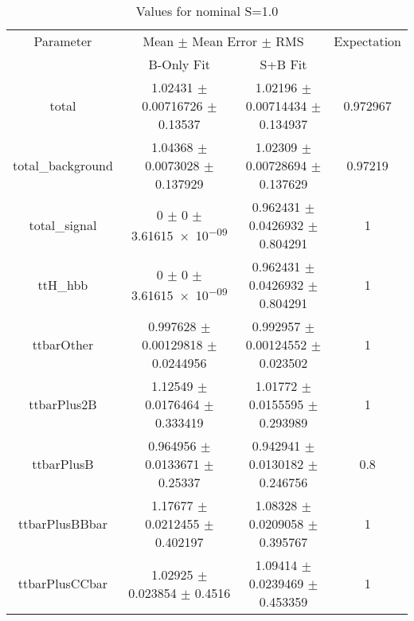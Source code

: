 \begin{table}
\centering
\caption{Values for nominal S=1.0}
\begin{tabular}{cccc}
\toprule
Parameter & \multicolumn{2}{c}{Mean $\pm$ Mean Error $\pm$ RMS} & Expectation\\
 & B-Only Fit & S+B Fit & \\
\midrule
total & \num{1.02431} $\pm$ \num{0.00716726} $\pm$ \num{0.13537} & \num{1.02196} $\pm$ \num{0.00714434} $\pm$ \num{0.134937} & \num{0.972967}\\
total\_background & \num{1.04368} $\pm$ \num{0.0073028} $\pm$ \num{0.137929} & \num{1.02309} $\pm$ \num{0.00728694} $\pm$ \num{0.137629} & \num{0.97219}\\
total\_signal & \num{0} $\pm$ \num{0} $\pm$ \num{3.61615e-09} & \num{0.962431} $\pm$ \num{0.0426932} $\pm$ \num{0.804291} & \num{1}\\
ttH\_hbb & \num{0} $\pm$ \num{0} $\pm$ \num{3.61615e-09} & \num{0.962431} $\pm$ \num{0.0426932} $\pm$ \num{0.804291} & \num{1}\\
ttbarOther & \num{0.997628} $\pm$ \num{0.00129818} $\pm$ \num{0.0244956} & \num{0.992957} $\pm$ \num{0.00124552} $\pm$ \num{0.023502} & \num{1}\\
ttbarPlus2B & \num{1.12549} $\pm$ \num{0.0176464} $\pm$ \num{0.333419} & \num{1.01772} $\pm$ \num{0.0155595} $\pm$ \num{0.293989} & \num{1}\\
ttbarPlusB & \num{0.964956} $\pm$ \num{0.0133671} $\pm$ \num{0.25337} & \num{0.942941} $\pm$ \num{0.0130182} $\pm$ \num{0.246756} & \num{0.8}\\
ttbarPlusBBbar & \num{1.17677} $\pm$ \num{0.0212455} $\pm$ \num{0.402197} & \num{1.08328} $\pm$ \num{0.0209058} $\pm$ \num{0.395767} & \num{1}\\
ttbarPlusCCbar & \num{1.02925} $\pm$ \num{0.023854} $\pm$ \num{0.4516} & \num{1.09414} $\pm$ \num{0.0239469} $\pm$ \num{0.453359} & \num{1}\\
\bottomrule
\end{tabular}
\end{table}